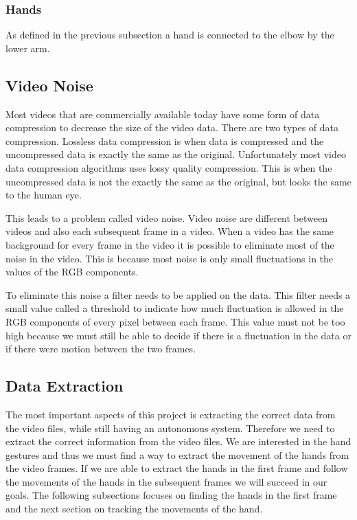 \documentclass[a4paper,11pt,titlepage]{article}
\begin{document}
\subsubsection{Hands}
As defined in the previous subsection a hand is connected to the elbow by the lower arm.

\subsection{Video Noise}
Most videos that are commercially available today have some form of data compression to decrease the size of the video data. There are two types of data compression. Lossless data compression is when data is compressed and the uncompressed data is exactly the same as the original. Unfortunately most video data compression algorithms uses lossy quality compression. This is when the uncompressed data is not the exactly the same as the original, but looks the same to the human eye.

This leads to a problem called video noise. Video noise are different between videos and also each subsequent frame in a video. When a video has the same background for every frame in the video it is possible to eliminate most of the noise in the video. This is because most noise is only small fluctuations in the values of the RGB components.

To eliminate this noise a filter needs to be applied on the data. This filter needs a small value called a threshold to indicate how much fluctuation is allowed in the RGB components of every pixel between each frame. This value must not be too high because we must still be able to decide if there is a fluctuation in the data or if there were motion between the two frames.

\subsection{Data Extraction}
The most important aspects of this project is extracting the correct data from the video files, while still having an autonomous system. Therefore we need to extract the correct information from the video files. We are interested in the hand gestures and thus we must find a way to extract the movement of the hands from the video frames. If we are able to extract the hands in the first frame and follow the movements of the hands in the subsequent frames we will succeed in our goals. The following subsections focuses on finding the hands in the first frame and the next section on tracking the movements of the hand.
\end{document}
